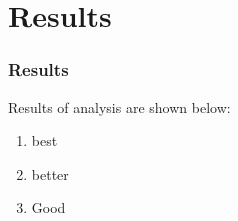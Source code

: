 \section{Results}
\begin{frame}
	\frametitle{Results}
	Results of analysis are shown below:
	\begin{enumerate}
		\item best
		\item better
		\item Good
	\end{enumerate}
\end{frame}